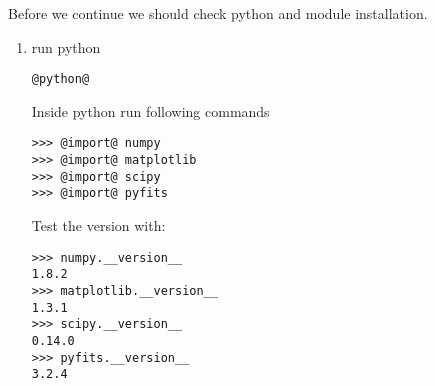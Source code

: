 Before we continue we should check python and module installation.

\begin{enumerate}
\item  run python
          
\begin{lstlisting}[style=bashstyle]
@python@
\end{lstlisting}

\noindent Inside python run following commands
\begin{lstlisting}[style=pythonstyle]
>>> @import@ numpy
>>> @import@ matplotlib
>>> @import@ scipy
>>> @import@ pyfits
\end{lstlisting}


\noindent Test the version with:
\begin{lstlisting}[style=pythonstyle]
>>> numpy.__version__
1.8.2
>>> matplotlib.__version__
1.3.1
>>> scipy.__version__
0.14.0
>>> pyfits.__version__
3.2.4
\end{lstlisting}

\end{enumerate}
